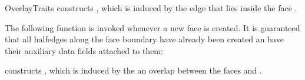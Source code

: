 \begin{ccRefConcept}{OverlayTraits}
    {constructs , which is induced by the edge  that lies
     inside the face .}

The following function is invoked whenever a new face is created. It is
guaranteed that all halfedges along the face boundary have already been
created an have their auxiliary data fields attached to them:

    {constructs , which is induced by the an overlap between the
     faces  and .}

\ccHasModels

\\
\\

\ccSeeAlso

\end{ccRefConcept}

\ccRefPageEnd

